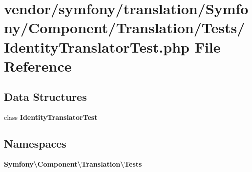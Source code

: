 \section{vendor/symfony/translation/\+Symfony/\+Component/\+Translation/\+Tests/\+Identity\+Translator\+Test.php File Reference}
\label{_identity_translator_test_8php}
\subsection*{Data Structures}
\begin{DoxyCompactItemize}
\item 
class {\bf Identity\+Translator\+Test}
\end{DoxyCompactItemize}
\subsection*{Namespaces}
\begin{DoxyCompactItemize}
\item 
 {\bf Symfony\textbackslash{}\+Component\textbackslash{}\+Translation\textbackslash{}\+Tests}
\end{DoxyCompactItemize}
